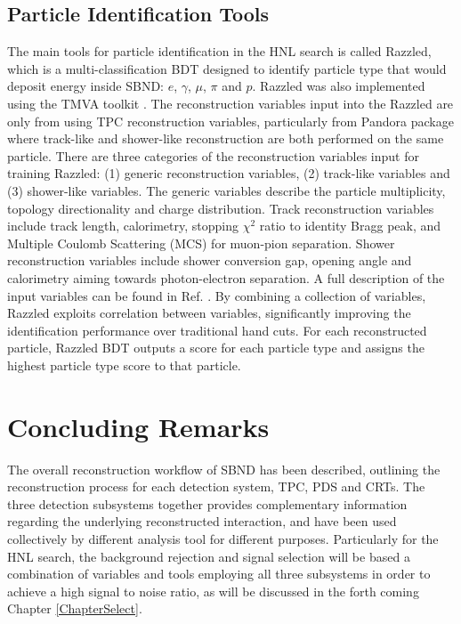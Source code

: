 \subsection{Particle Identification Tools}
\label{sec:razzled}

The main tools for particle identification in the HNL search is called Razzled, which is a multi-classification BDT designed to identify particle type that would deposit energy inside SBND: $e$, $\gamma$, $\mu$, $\pi$ and $p$.
Razzled was also implemented using the TMVA toolkit \cite{tmva}.
The reconstruction variables input into the Razzled are only from using TPC reconstruction variables, particularly from Pandora package where track-like and shower-like reconstruction are both performed on the same particle.
There are three categories of the reconstruction variables input for training Razzled: (1) generic reconstruction variables, (2) track-like variables and (3) shower-like variables.
The generic variables describe the particle multiplicity, topology directionality and charge distribution.
Track reconstruction variables include track length, calorimetry, stopping $\chi^{2}$ ratio to identity Bragg peak, and Multiple Coulomb Scattering (MCS) for muon-pion separation.
Shower reconstruction variables include shower conversion gap, opening angle and calorimetry aiming towards photon-electron separation.
A full description of the input variables can be found in Ref. \cite{EdPhD}.
By combining a collection of variables, Razzled exploits correlation between variables, significantly improving the identification performance over traditional hand cuts.
For each reconstructed particle, Razzled BDT outputs a score for each particle type and assigns the highest particle type score to that particle.

\section{Concluding Remarks}
\label{sec:reco_concluding_remarks}

The overall reconstruction workflow of SBND has been described, outlining the reconstruction process for each detection system, TPC, PDS and CRTs.
The three detection subsystems together provides complementary information regarding the underlying reconstructed interaction, and have been used collectively by different analysis tool for different purposes.
Particularly for the HNL search, the background rejection and signal selection will be based a combination of variables and tools employing all three subsystems in order to achieve a high signal to noise ratio, as will be discussed in the forth coming Chapter \ref{ChapterSelect}.
